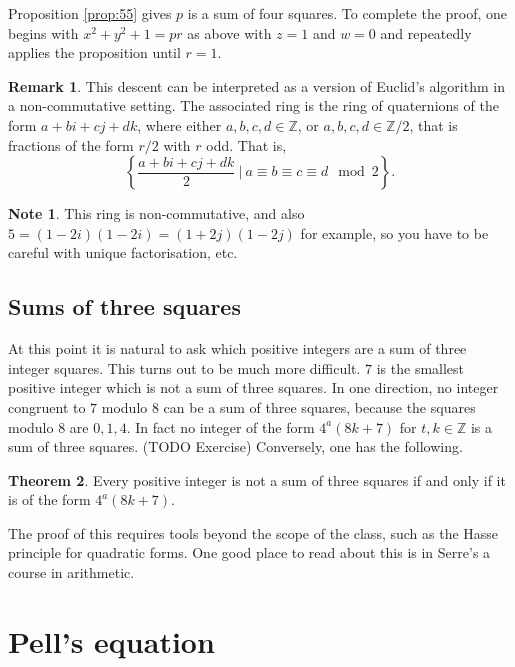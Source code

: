 \documentclass{article}
\newcommand{\Z}{\mathbb{Z}}
\newcommand{\rb}[1]{\left( #1 \right)}
\newcommand{\cb}[1]{\left\{ #1 \right\}}
\theoremstyle{definition}\newtheorem{definition}{Definition}
\theoremstyle{definition}\newtheorem{remark}[definition]{Remark}
\theoremstyle{definition}\newtheorem*{example}{Example}
\theoremstyle{definition}\newtheorem*{note}{Note}
\newtheorem{theorem}[definition]{Theorem}
\begin{document}
Proposition \ref{prop:55} gives $ p $ is a sum of four squares. To complete the proof, one begins with $ x^2 + y^2 + 1 = pr $ as above with $ z = 1 $ and $ w = 0 $ and repeatedly applies the proposition until $ r = 1 $.

\begin{remark}
This descent can be interpreted as a version of Euclid's algorithm in a non-commutative setting. The associated ring is the ring of quaternions of the form $ a + bi + cj + dk $, where either $ a, b, c, d \in \Z $, or $ a, b, c, d \in \Z / 2 $, that is fractions of the form $ r / 2 $ with $ r $ odd. That is,
$$ \cb{\dfrac{a + bi + cj + dk}{2} \ \Bigg| \ a \equiv b \equiv c \equiv d \mod 2}. $$
\end{remark}

\begin{note}
This ring is non-commutative, and also $ 5 = \rb{1 - 2i}\rb{1 - 2i} = \rb{1 + 2j}\rb{1 - 2j} $ for example, so you have to be careful with unique factorisation, etc.
\end{note}

\subsection{Sums of three squares}

At this point it is natural to ask which positive integers are a sum of three integer squares. This turns out to be much more difficult. $ 7 $ is the smallest positive integer which is not a sum of three squares. In one direction, no integer congruent to $ 7 $ modulo $ 8 $ can be a sum of three squares, because the squares modulo $ 8 $ are $ 0, 1, 4 $. In fact no integer of the form $ 4^a\rb{8k + 7} $ for $ t, k \in \Z $ is a sum of three squares. (TODO Exercise) Conversely, one has the following.

\begin{theorem}
Every positive integer is not a sum of three squares if and only if it is of the form $ 4^a\rb{8k + 7} $.
\end{theorem}

The proof of this requires tools beyond the scope of the class, such as the Hasse principle for quadratic forms. One good place to read about this is in Serre's a course in arithmetic.

\section{Pell's equation}
\end{document}
